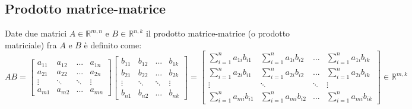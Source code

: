 \documentclass{article}
\begin{document}
\subsection{Prodotto matrice-matrice} \label{subsec:matmul}
    Date due matrici $A \in \mathbb{R}^{m, n}$ e $B \in \mathbb{R}^{n, k}$ il prodotto matrice-matrice (o prodotto matriciale) fra $A$ e $B$ è definito come:
    \[
        AB = 
        \begin{bmatrix}
            a_{11} & a_{12} & ... & a_{1n} \\
            a_{21} & a_{22} & ... & a_{2n} \\
            \vdots & \ddots & \ddots & \vdots \\
            a_{m1} & a_{m2} & ... & a_{mn} 
        \end{bmatrix} 
        \begin{bmatrix}
            b_{11} & b_{12} & ... & b_{1k} \\
            b_{21} & b_{22} & ... & b_{2k} \\
            \vdots & \ddots & \ddots & \vdots \\
            b_{n1} & b_{n2} & ... & b_{nk} 
        \end{bmatrix}
        = 
        \begin{bmatrix}
            \displaystyle\sum_{i = 1}^{n}{a_{1i} b_{i1}} & \displaystyle\sum_{i = 1}^{n}{a_{1i} b_{i2}} & ... & \displaystyle\sum_{i = 1}^{n}{a_{1i} b_{ik}} \\
            \displaystyle\sum_{i = 1}^{n}{a_{2i} b_{i1}} & \displaystyle\sum_{i = 1}^{n}{a_{2i} b_{i2}} & ... & \displaystyle\sum_{i = 1}^{n}{a_{2i} b_{ik}} \\
            \vdots & \ddots & \ddots & \vdots \\
            \displaystyle\sum_{i = 1}^{n}{a_{mi} b_{i1}} & \displaystyle\sum_{i = 1}^{n}{a_{mi} b_{i2}} & ... & \displaystyle\sum_{i = 1}^{n}{a_{mi} b_{ik}} 
        \end{bmatrix}
        \in \mathbb{R}^{m, k}
    \]
\end{document}
